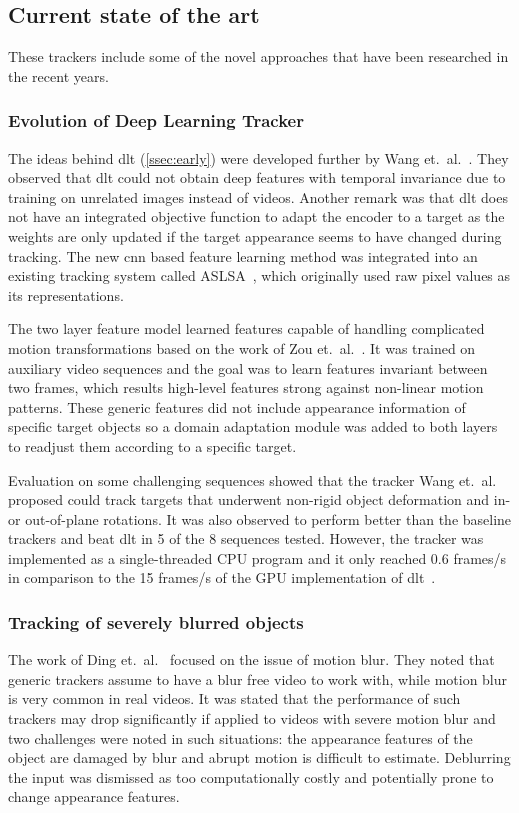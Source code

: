 \subsection{Current state of the art}
These trackers include some of the novel approaches that have been researched in the recent years.

\subsubsection{Evolution of Deep Learning Tracker}\label{sssec:learned_hierarch}
The ideas behind \ac{dlt} (\ref{ssec:early}) were developed further by Wang et.~al.~\cite{LEARNED_HIERARCH}. They observed that \ac{dlt} could not obtain deep features with temporal invariance due to training on unrelated images instead of videos. Another remark was that \ac{dlt} does not have an integrated objective function to adapt the encoder to a target as the weights are only updated if the target appearance seems to have changed during tracking. The new \ac{cnn} based feature learning method was integrated into an existing tracking system called ASLSA~\cite{ASLSA}, which originally used raw pixel values as its representations.~\cite{LEARNED_HIERARCH}

The two layer feature model learned features capable of handling complicated motion transformations based on the work of Zou et.~al.~\cite{INVARIANT_FEATS}. It was trained on auxiliary video sequences and the goal was to learn features invariant between two frames, which results high-level features strong against non-linear motion patterns. These generic features did not include appearance information of specific target objects so a domain adaptation module was added to both layers to readjust them according to a specific target.~\cite{LEARNED_HIERARCH}

Evaluation on some challenging sequences showed that the tracker Wang et.~al.~\cite{LEARNED_HIERARCH} proposed could track targets that underwent non-rigid object deformation and in- or out-of-plane rotations. It was also observed to perform better than the baseline trackers and beat \ac{dlt} in 5 of the 8 sequences tested. However, the tracker was implemented as a single-threaded CPU program and it only reached 0.6 frames/s in comparison to the 15 frames/s of the GPU implementation of \ac{dlt}~\cite{DLT}.

\subsubsection{Tracking of severely blurred objects}\label{sssec:blur}
The work of Ding et.~al.~\cite{BLUR_TRACK} focused on the issue of motion blur. They noted that generic trackers assume to have a blur free video to work with, while motion blur is very common in real videos. It was stated that the performance of such trackers may drop significantly if applied to videos with severe motion blur and two challenges were noted in such situations: the appearance features of the object are damaged by blur and abrupt motion is difficult to estimate. Deblurring the input was dismissed as too computationally costly and potentially prone to change appearance features.~\cite{BLUR_TRACK}

